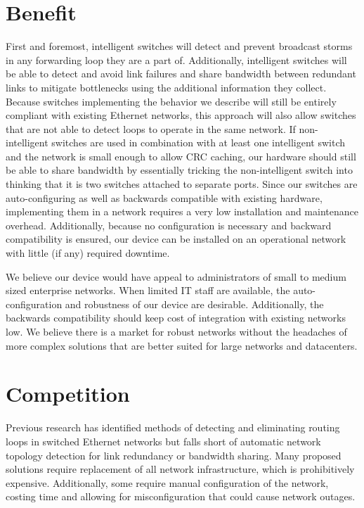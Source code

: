 \documentclass{article}
\begin{document}
\begin{multicols}{2}
\section{Benefit}
  First and foremost, intelligent switches will detect and prevent broadcast storms in any forwarding loop they are a part of.
	Additionally, intelligent switches will be able to detect and avoid link failures and share bandwidth between redundant links to mitigate bottlenecks using the additional information they collect.
	Because switches implementing the behavior we describe will still be entirely compliant with existing Ethernet networks, this approach will also allow switches that are not able to detect loops to operate in the same network.
	If non-intelligent switches are used in combination with at least one intelligent switch and the network is small enough to allow CRC caching, our hardware should still be able to share bandwidth by essentially tricking the non-intelligent switch into thinking that it is two switches attached to separate ports.
	Since our switches are auto-configuring as well as backwards compatible with existing hardware, implementing them in a network requires a very low installation and maintenance overhead.
	Additionally, because no configuration is necessary and backward compatibility is ensured, our device can be installed on an operational network with little (if any) required downtime.
	
	We believe our device would have appeal to administrators of small to medium sized enterprise networks.
	When limited IT staff are available, the auto-configuration and robustness of our device are desirable.
	Additionally, the backwards compatibility should keep cost of integration with existing networks low.
	We believe there is a market for robust networks without the headaches of more complex solutions that are better suited for large networks and datacenters.
\section{Competition}
	Previous research has identified methods of detecting and eliminating routing loops in switched Ethernet networks but falls short of automatic network topology detection for link redundancy or bandwidth sharing.
	Many proposed solutions require replacement of all network infrastructure, which is prohibitively expensive.
	Additionally, some require manual configuration of the network, costing time and allowing for misconfiguration that could cause network outages.
	

\end{multicols}
\end{document}
